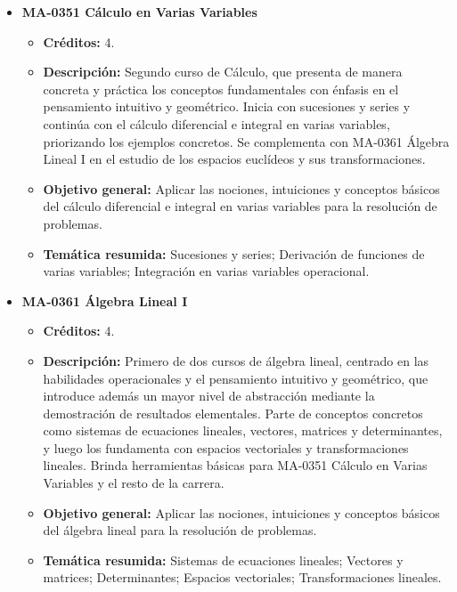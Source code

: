 \begin{itemize}[leftmargin=1.3em, itemsep=10pt, topsep=4pt, label={\color{Azul-UCR}$\blacksquare$}]
\item {\color{Azul-UCR}\textbf{MA-0351 Cálculo en Varias Variables}}\par\nopagebreak\smallskip
\begin{itemize}[leftmargin=1.1em, itemsep=3pt, topsep=2pt, parsep=2pt, label={\textendash}]
\item \textbf{Créditos:} 4.
\item \textbf{Descripción:} Segundo curso de Cálculo, que presenta de manera concreta y práctica los conceptos fundamentales con énfasis en el pensamiento intuitivo y geométrico. Inicia con sucesiones y series y continúa con el cálculo diferencial e integral en varias variables, priorizando los ejemplos concretos. Se complementa con MA-0361 Álgebra Lineal I en el estudio de los espacios euclídeos y sus transformaciones.
\item \textbf{Objetivo general:} Aplicar las nociones, intuiciones y conceptos básicos del cálculo diferencial e integral en varias variables para la resolución de problemas.
\item \textbf{Temática resumida:} Sucesiones y series; Derivación de funciones de varias variables; Integración en varias variables operacional.
\end{itemize}

\item {\color{Azul-UCR}\textbf{MA-0361 Álgebra Lineal I}}\par\nopagebreak\smallskip
\begin{itemize}[leftmargin=1.1em, itemsep=3pt, topsep=2pt, parsep=2pt, label={\textendash}]
\item \textbf{Créditos:} 4.
\item \textbf{Descripción:} Primero de dos cursos de álgebra lineal, centrado en las habilidades operacionales y el pensamiento intuitivo y geométrico, que introduce además un mayor nivel de abstracción mediante la demostración de resultados elementales. Parte de conceptos concretos como sistemas de ecuaciones lineales, vectores, matrices y determinantes, y luego los fundamenta con espacios vectoriales y transformaciones lineales. Brinda herramientas básicas para MA-0351 Cálculo en Varias Variables y el resto de la carrera.
\item \textbf{Objetivo general:} Aplicar las nociones, intuiciones y conceptos básicos del álgebra lineal para la resolución de problemas.
\item \textbf{Temática resumida:} Sistemas de ecuaciones lineales; Vectores y matrices; Determinantes; Espacios vectoriales; Transformaciones lineales.
\end{itemize}


\end{itemize}
